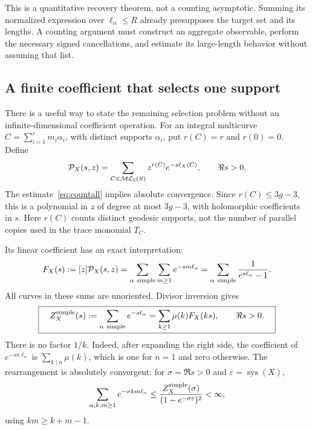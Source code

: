 This is a quantitative recovery theorem, not a counting asymptotic.
Summing its normalized expression over $\ell_\alpha\leq R$
already presupposes the target set and its lengths. A counting
argument must construct an aggregate observable, perform the
necessary signed cancellations, and estimate its large-length
behavior without assuming that list.

\subsection{A finite coefficient that selects one support}
\label{subsec:countsupport}

There is a useful way to state the remaining selection problem without
an infinite-dimensional coefficient operation. For an integral
multicurve $C=\sum_{i=1}^r m_i\alpha_i$, with distinct supports
$\alpha_i$, put $r(C)=r$ and $r(0)=0$. Define
\begin{equation}
 \mathcal P_X(s,z)=\sum_{C\in\mathcal{ML}_{\mathbb Z}(S)}
       z^{r(C)}e^{-s\ell_X(C)},\qquad \Re s>0.
 \label{eq:countsupportpartition}
\end{equation}
The estimate~\eqref{eq:countall} implies absolute
convergence. Since $r(C)\leq3g-3$, this is a polynomial in $z$ of
degree at most $3g-3$, with holomorphic coefficients in $s$.
Here $r(C)$ counts distinct geodesic supports, not the number of
parallel copies used in the trace monomial $T_C$.

Its linear coefficient has an exact interpretation:
\begin{equation}
 F_X(s):=[z]\mathcal P_X(s,z)
 =\sum_{\alpha\ {\rm simple}}\sum_{m\geq1}e^{-sm\ell_\alpha}
 =\sum_{\alpha\ {\rm simple}}\frac{1}{e^{s\ell_\alpha}-1}.
 \label{eq:countonesupport}
\end{equation}
All curves in these sums are unoriented. Divisor inversion gives
\begin{equation}
 \boxed{\quad
 Z_X^{\rm simple}(s):=\sum_{\alpha\ {\rm simple}}e^{-s\ell_\alpha}
 =\sum_{k\geq1}\mu(k)F_X(ks),\qquad \Re s>0.
 \quad}
 \label{eq:countsupportmobius}
\end{equation}
There is no factor $1/k$. Indeed, after expanding the right side,
the coefficient of $e^{-sn\ell_\alpha}$ is
$\sum_{k\mid n}\mu(k)$, which is one for $n=1$ and zero otherwise.
The rearrangement is absolutely convergent: for
$\sigma=\Re s>0$ and $\varepsilon=\operatorname{sys}(X)$,
\[
 \sum_{\alpha,k,m\geq1}e^{-\sigma km\ell_\alpha}
 \leq\frac{Z_X^{\rm simple}(\sigma)}
               {(1-e^{-\sigma\varepsilon})^2}<\infty,
\]
using $km\geq k+m-1$.

